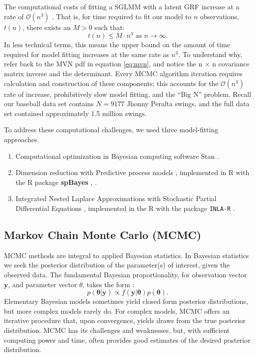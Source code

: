 The computational costs of fitting a SGLMM with a latent GRF increase at a rate of $\mathcal{O}(n^{3})$ \citep{Finley2009}. That is, for time  required to fit our model to $n$ observations, $t(n)$, there exists an $M > 0$ such that:
$$t(n) \leq M \cdot n^{3} \text{ as } n \rightarrow \infty.$$
In less technical terms, this means the upper bound on the amount of time required for model fitting increases at the same rate as $n^{3}$. To understand why, refer back to the MVN pdf in equation \ref{eq:mvn}, and notice the n $\times$ n covariance matrix inverse and the determinant. Every MCMC algorithm iteration requires calculation and construction of these components; this accounts for the $\mathcal{O}(n^{3})$ rate of increase, prohibitively slow model fitting, and the ``Big N'' problem. Recall our baseball data set contains $N = 9177$ Jhonny Peralta swings, and the full data set contained approximately 1.5 million swings.

To address these computational challenges, we used three model-fitting approaches.
\begin{enumerate}
\item Computational optimization in Bayesian computing software Stan \citep{rstan}.
\item Dimension reduction with Predictive process models \citep{Finley2012}, implemented in R with the R package {\bf spBayes} , \citep{Finley2013}.
\item Integrated Nested Laplace Approximations \citep{Rue2009} with Stochastic Partial Differential Equations \citep{Lindgren2011}, implemented in the R with the package \verb|INLA-R| \citep{Lindgren2015}.
\end{enumerate}

\subsection{Markov Chain Monte Carlo (MCMC)}

MCMC methods are integral to applied Bayesian statistics. In Bayesian statistics we seek the posterior distribution of the parameter(s) of interest, given the observed data. The fundamental Bayesian proportionality, for observation vector $\pmb{y}$, and parameter vector $\theta$, takes the form \citep{Gelman2014}:
\begin{equation} \label{eq:bayes}
p(\pmb{\theta}|\pmb{y}) \propto f(\pmb{y}|\pmb{\theta})p(\pmb{\theta}).
\end{equation}
Elementary Bayesian models sometimes yield closed form posterior distributions, but more complex models rarely do. For complex models, MCMC offers an iterative procedure that, upon convergence, yields draws from the true posterior distribution. MCMC has its challenges and weaknesses, but, with sufficient computing power and time, often provides good estimates of the desired posterior distribution. 

